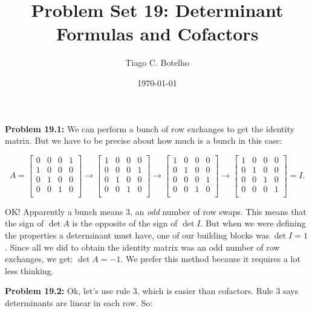 \documentclass{article}
\title{Problem Set 19: Determinant Formulas and Cofactors}
\author{Tiago C. Botelho}
\date{\today}
\begin{document}
\maketitle

\noindent \textbf{Problem 19.1:} We can perform a bunch of row exchanges to get the identity matrix. But we have to be precise about how much is a bunch in this case:

\[
A = \begin{bmatrix}
0 & 0 & 0 & 1\\
1 & 0 & 0 & 0\\
0 & 1 & 0 & 0\\
0 & 0 & 1 & 0\\
\end{bmatrix}
\to
\begin{bmatrix}
1 & 0 & 0 & 0\\
0 & 0 & 0 & 1\\
0 & 1 & 0 & 0\\
0 & 0 & 1 & 0\\
\end{bmatrix}
\to
\begin{bmatrix}
1 & 0 & 0 & 0\\
0 & 1 & 0 & 0\\
0 & 0 & 0 & 1\\
0 & 0 & 1 & 0\\
\end{bmatrix}
\to
\begin{bmatrix}
1 & 0 & 0 & 0\\
0 & 1 & 0 & 0\\
0 & 0 & 1 & 0\\
0 & 0 & 0 & 1\\
\end{bmatrix}
= I.
\]

OK! Apparently a bunch means 3, an \textit{odd} number of row swaps. This means that the sign of $\det A$ is the opposite of the sign of $\det I$. But when we were defining the properties a determinant must have, one of our building blocks was $\det I = 1$. Since all we did to obtain the identity matrix was an odd number of row exchanges, we get: $\det A = -1$. We prefer this method because it requires a lot less thinking.

\noindent \textbf{Problem 19.2:} Ok, let's use rule 3, which is easier than cofactors. Rule 3 says determinants are linear in each row. So:
\end{document}
